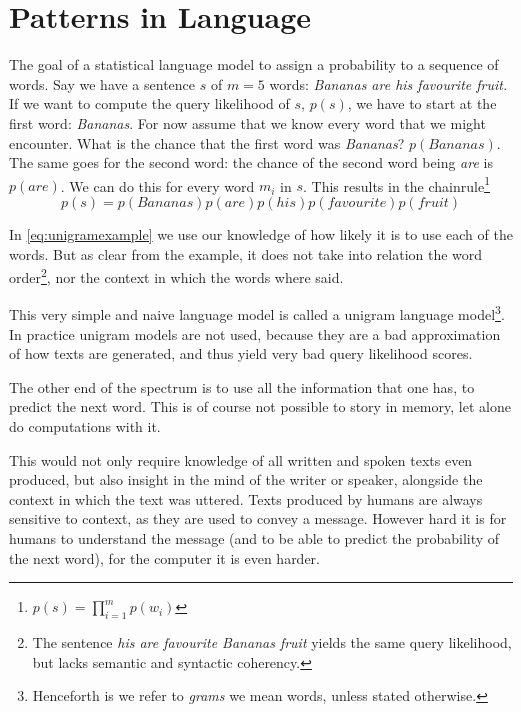 
\section{Patterns in Language}
The goal of a statistical language model to assign a probability to a sequence of words. Say we have a sentence $s$ of $m=5$ words: \emph{Bananas are his favourite fruit.} If we want to compute the query likelihood of $s$, $p(s)$, we have to start 
at the first word: \emph{Bananas}. For now assume that we know every word that we might encounter. What is the chance that the first word was \emph{Bananas}? $p(\mathit{Bananas})$. The same goes for the second word: the chance of the second word being \emph{are} is $p(\mathit{are})$. We can do this for every word $m_i$ in $s$. This results in the chainrule\footnote{$p(s)=\prod_{i=1}^m p(w_i)$}
\begin{equation}
p(s) = p(\mathit{Bananas})p(\mathit{are})p(\mathit{his})p(\mathit{favourite})p(\mathit{fruit})\label{eq:unigramexample}
\end{equation}

In \cref{eq:unigramexample} we use our knowledge of how likely it is to use each of the words. But as clear from the example, it does not take into relation the word order\footnote{The sentence \emph{his are favourite Bananas fruit} yields the same query likelihood, but lacks semantic and syntactic coherency.}, nor the context in which the words where said.

This very simple and naive language model is called a unigram language model\footnote{Henceforth is we refer to \emph{grams} we mean words, unless stated otherwise.}. In practice unigram models are not used, because they are a bad approximation of how texts are generated, and thus yield very bad query likelihood scores.

The other end of the spectrum is to use all the information that one has, to predict the next word. This is of course not possible to story in memory, let alone do computations with it.

This would not only require knowledge of all written and spoken texts even produced, but also insight in the mind of the writer or speaker, alongside the context in which the text was uttered. Texts produced by humans are always sensitive to context, as they are used to convey a message. However hard it is for humans to understand the message (and to be able to predict the probability of the next word), for the computer it is even harder.

